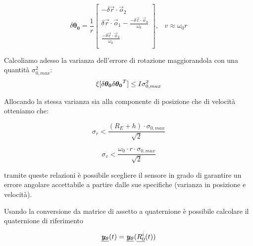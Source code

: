 \begin{equation}
	\delta \boldsymbol{\theta_0}= \frac{1}{r}
	\begin{bmatrix}
	-\delta\vec{r}\cdot\vec{o}_2\\
	\delta\vec{r}\cdot\vec{o}_1-\frac{-\delta\vec{v}\cdot\vec{o}_3}{\omega_0}\\
	\frac{-\delta\vec{v}\cdot\vec{o}_2}{\omega_0}\\
	\end{bmatrix}
,\hspace{10pt} v\approx\omega_0 r 
\end{equation}

Calcoliamo adesso la varianza dell'errore di rotazione maggiorandola con una
quantità $\sigma^2_{0,max}$:
\begin{equation}
\xi[\delta\boldsymbol{\theta_0}
\delta\boldsymbol{\theta_0}^T]\le I \sigma^2_{0,max}
\end{equation}

Allocando la stessa varianza sia alla componente di posizione che di velocità
otteniamo che:

\begin{equation}
\sigma_r < \frac{(R_E + h)\cdot\sigma_{0,max}}{\sqrt{2}}
\end{equation}

\begin{equation}
\sigma_v < \frac{\omega_0\cdot r\cdot \sigma_{0,max}}{\sqrt{2}}
\end{equation}

tramite queste relazioni è possibile scegliere il sensore in grado di garantire
un errore angolare accettabile a partire dalle sue specifiche (varianza in
posizione e velocità).

Usando la conversione da matrice di assetto a quaternione è possibile calcolare
il quaternione di riferimento

\begin{equation}
	\underline{\boldsymbol{\mathit{y_0}}}(t)=\underline{\boldsymbol{\mathit{y_0}}}(\underline{R_{0}^{i}}(t))
\end{equation}

